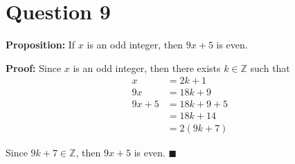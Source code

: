 \documentclass[11pt, oneside]{article}   	%
\newcommand*{\QEDA}{\hfill\ensuremath{\blacksquare}}         %
\begin{document}
%           
%	   
%            
%            
%
%           




\section*{Question 9}

\textbf{Proposition:} If $x$ is an odd integer, then $9x+5$ is even.

\textbf{Proof:} Since $x$ is an odd integer, then there exists $k \in \mathbb{Z}$ such that
\begin{align*}
	x & = 2k+1 \\
	9x & = 18k+9 \\
	9x + 5 & = 18k + 9 + 5 \\
	& = 18k+14 \\
	& = 2(9k+7)
\end{align*}

Since $9k+7 \in \mathbb{Z}$, then $9x+5$ is even. \QEDA
\end{document}
